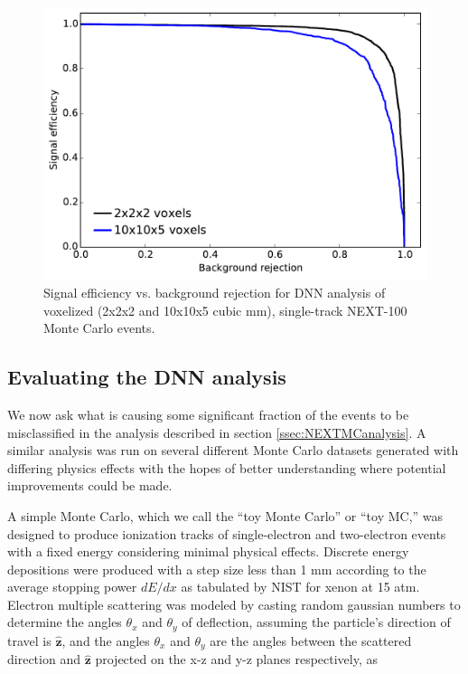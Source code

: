 \documentclass[a4paper,11pt]{article}
\begin{document}
\begin{figure}[!htb]
	\centering
	\includegraphics[scale=0.6]{fig/sigvsbg_DNN.pdf}
	\caption{\label{fig_svsb}Signal efficiency vs. background rejection for DNN analysis of voxelized (2x2x2 and 10x10x5 cubic mm), single-track NEXT-100 Monte Carlo events.}
\end{figure}

\subsection{Evaluating the DNN analysis}\label{ssec:DNNeval}
We now ask what is causing some significant fraction of the events to be misclassified in the analysis described in section \ref{ssec:NEXTMCanalysis}.  A similar analysis was run on 
several different Monte Carlo datasets generated with differing physics effects with the hopes of better understanding where potential improvements could be made.

A simple Monte Carlo, which we call the ``toy Monte Carlo'' or ``toy MC,'' was designed to produce ionization tracks of single-electron and two-electron events with a fixed energy
considering minimal physical effects.  Discrete energy depositions were produced with a step size less than 1 mm according to the average stopping power $dE/dx$ as tabulated by
NIST \cite{NIST_mac} for xenon at 15 atm.  Electron multiple scattering was modeled by casting random gaussian numbers to determine the angles $\theta_{x}$ and $\theta_{y}$ of deflection, 
assuming the particle's direction of travel is $\hat{\mathbf{z}}$, and the angles $\theta_{x}$ and $\theta_{y}$ are the angles between the scattered direction and $\hat{\mathbf{z}}$ projected on 
the x-z and y-z planes respectively, as
\end{document}
